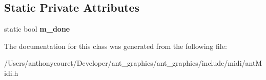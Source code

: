 \subsection*{Static Private Attributes}
\begin{DoxyCompactItemize}
\item 
\hypertarget{classant_midi_a936ada34eb4af9b1437e72bcfcf098d7}{static bool {\bfseries m\+\_\+done}}\label{classant_midi_a936ada34eb4af9b1437e72bcfcf098d7}

\end{DoxyCompactItemize}


The documentation for this class was generated from the following file\+:\begin{DoxyCompactItemize}
\item 
/\+Users/anthonycouret/\+Developer/ant\+\_\+graphics/ant\+\_\+graphics/include/midi/ant\+Midi.\+h\end{DoxyCompactItemize}
